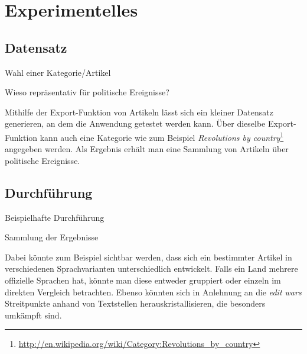 \chapter{Experimentelles}\label{ch:experiment}

\section{Datensatz}

\begin{todos}
    \item Wahl einer Kategorie/Artikel
    \item Wieso repräsentativ für politische Ereignisse?
\end{todos}

Mithilfe der Export-Funktion von Artikeln lässt sich ein kleiner Datensatz generieren, an dem die Anwendung getestet werden kann.
Über dieselbe Export-Funktion kann auch eine Kategorie wie zum Beispiel \emph{Revolutions by country}\footnote{\url{http://en.wikipedia.org/wiki/Category:Revolutions_by_country}} angegeben werden. 
Als Ergebnis erhält man eine Sammlung von Artikeln über politische Ereignisse.


\section{Durchführung}

\begin{todos}
    \item Beispielhafte Durchführung
    \item Sammlung der Ergebnisse
\end{todos}

Dabei könnte zum Beispiel sichtbar werden, dass sich ein bestimmter Artikel in verschiedenen Sprachvarianten unterschiedlich entwickelt. 
Falls ein Land mehrere offizielle Sprachen hat, könnte man diese entweder gruppiert oder einzeln im direkten Vergleich betrachten.
Ebenso könnten sich in Anlehnung an die \emph{edit wars} Streitpunkte anhand von Textstellen herauskristallisieren, die besonders umkämpft sind. 

